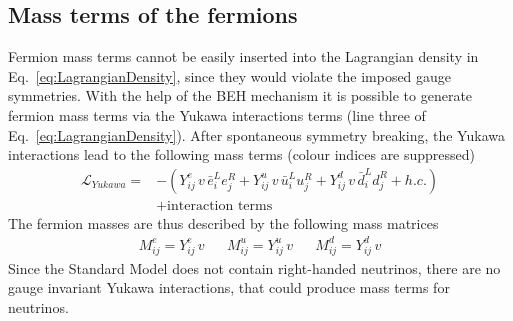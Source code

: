 \subsection*{Mass terms of the fermions}
Fermion mass terms cannot be easily inserted into the Lagrangian density in Eq.~\eqref{eq:LagrangianDensity}, since they would violate the imposed gauge symmetries.
With the help of the BEH mechanism it is possible to generate fermion mass terms via the Yukawa interactions terms (line three of Eq.~\eqref{eq:LagrangianDensity}).
After spontaneous symmetry breaking, the Yukawa interactions lead to the following mass terms (colour indices are suppressed)
\begin{equation}
 \begin{split}
  \mathcal{L}_{Yukawa} = & - \left( Y^e_{ij}\, v\, \bar{e}^L_i  e^R_j + Y^u_{ij}\, v\, \bar{u}^L_i  u^R_j 
+ Y^d_{ij}\, v\, \bar{d}^L_i  d^R_j + h.c. \right) \\
    &+ \text{interaction terms}
 \end{split}
\end{equation}
The fermion masses are thus described by the following mass matrices
\begin{align}
 M_{ij}^e = Y_{ij}^e \, v && M_{ij}^u =  Y_{ij}^u \, v && M_{ij}^d =  Y_{ij}^d \, v 
\end{align}
Since the Standard Model does not contain right-handed neutrinos, there are no gauge invariant Yukawa interactions, that could produce mass terms for neutrinos.



